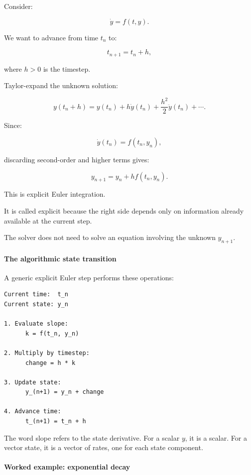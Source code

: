 Consider:

\[
\dot y=f(t,y).
\]

We want to advance from time \(t_n\) to:

\[
t_{n+1}=t_n+h,
\]

where \(h>0\) is the timestep.

Taylor-expand the unknown solution:

\[
y(t_n+h) = y(t_n) + h\dot y(t_n) + \frac{h^2}{2}\ddot y(t_n) +\cdots.
\]

Since:

\[
\dot y(t_n)=f(t_n,y_n),
\]

discarding second-order and higher terms gives:

\[
\boxed{ y_{n+1}=y_n+h f(t_n,y_n) }.
\]

This is explicit Euler integration.

It is called explicit because the right side depends only on information already available at the current step.

The solver does not need to solve an equation involving the unknown \(y_{n+1}\).

\paragraph{The algorithmic state transition}\label{02-foundations-ii-ch025-the-algorithmic-state-transition}

A generic explicit Euler step performs these operations:

\begin{verbatim}
Current time:  t_n
Current state: y_n

1. Evaluate slope:
      k = f(t_n, y_n)

2. Multiply by timestep:
      change = h * k

3. Update state:
      y_(n+1) = y_n + change

4. Advance time:
      t_(n+1) = t_n + h
\end{verbatim}

The word slope refers to the state derivative. For a scalar \(y\), it is a scalar. For a vector state, it is a vector of rates, one for each state component.

\paragraph{Worked example: exponential decay}\label{02-foundations-ii-ch025-worked-example-exponential-decay}

